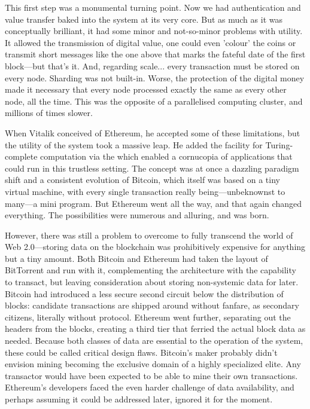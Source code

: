 This first step was a monumental turning point. Now we had authentication and value transfer baked into the system at its very core. But as much as it was conceptually brilliant, it had some minor and not-so-minor problems with utility. It allowed the transmission of digital value, one could even 'colour' the coins or transmit short messages like the one above that marks the fateful date of the first block—but that's it. And, regarding scale... every transaction must be stored on every node. Sharding was not built-in. Worse, the protection of the digital money made it necessary that every node processed exactly the same as every other node, all the time. This was the opposite of a parallelised computing cluster, and millions of times slower.

When Vitalik conceived of Ethereum, he accepted some of these limitations, but the utility of the system took a massive leap. He added the facility for Turing-complete computation via the  which enabled a cornucopia of applications that could run in this trustless setting. The concept was at once a dazzling paradigm shift and a consistent evolution of Bitcoin, which itself was based on a tiny virtual machine, with every single transaction really being—unbeknownst to many—a mini program. But Ethereum went all the way, and that again changed everything. The possibilities were numerous and alluring, and  was born.

However, there was still a problem to overcome to fully transcend the world of Web 2.0—storing data on the blockchain was prohibitively expensive for anything but a tiny amount. Both Bitcoin and Ethereum had taken the layout of BitTorrent and run with it, complementing the architecture with the capability to transact, but leaving consideration about storing non-systemic data for later. Bitcoin had introduced a less secure second circuit below the distribution of blocks: candidate transactions are shipped around without fanfare, as secondary citizens, literally without protocol. Ethereum went further, separating out the headers from the blocks, creating a third tier that ferried the actual block data as needed. Because both classes of data are essential to the operation of the system, these could be called critical design flaws. Bitcoin's maker probably didn't envision mining becoming the exclusive domain of a highly specialized elite. Any transactor would have been expected to be able to mine their own transactions. Ethereum's developers faced the even harder challenge of data availability, and perhaps assuming it could be addressed later, ignored it for the moment. 

